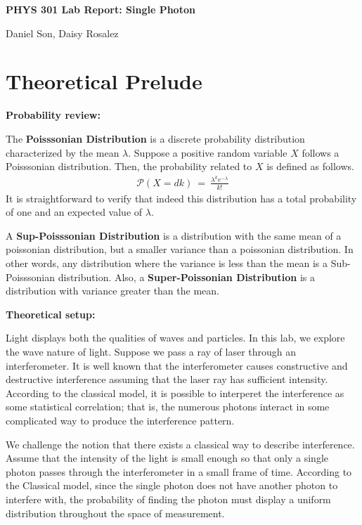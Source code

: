 \documentclass{article}
\numberwithin{equation}{section}
\begin{document}
\begin{center}
    \Large
    \textbf{PHYS 301 Lab Report: Single Photon}

    \large
    Daniel Son, Daisy Rosalez
\end{center}

\section{Theoretical Prelude}

\textbf{Probability review:}

The \textbf{Poisssonian Distribution} is a discrete probability 
distribution characterized by the mean $\lambda$. Suppose a positive
random variable $X$ follows a Poisssonian distribution. Then, the 
probability related to $X$ is defined as follows. 
\begin{align}
    \mathcal P (X = dk) \ = \ 
    \frac {\lambda ^k e^{-\lambda }}{k!}
\end{align}
It is straightforward to verify that indeed this distribution has a total 
probability of one and an expected value of $\lambda$. 

A \textbf{Sup-Poisssonian Distribution} is a distribution with the 
same mean of a poissonian distribution, but a smaller variance than 
a poissonian distribution. In other words, any distribution where 
the variance is less than the mean is a Sub-Poisssonian distribution.
Also, a \textbf{Super-Poissonian Distribution} is a distribution with 
variance greater than the mean.  
\newline

\noindent
\textbf{Theoretical setup:}

Light displays both the qualities of waves and particles. In this lab, 
we explore the wave nature of light. Suppose we pass a ray of laser through 
an interferometer. It is well known that the interferometer causes 
constructive and destructive interference assuming that the laser 
ray has sufficient intensity. According to the classical model, it is 
possible to interperet the interference as some statistical correlation; 
that is, the numerous photons interact in some complicated way 
to produce the interference pattern. 

We challenge the notion that there exists a classical way to describe 
interference. Assume that the intensity of the light is small enough 
so that only a single photon passes through the interferometer in a 
small frame of time. According to the Classical model, since the 
single photon does not have another photon to interfere with, the 
probability of finding the photon must display a uniform distribution 
throughout the space of measurement. 
\end{document}
